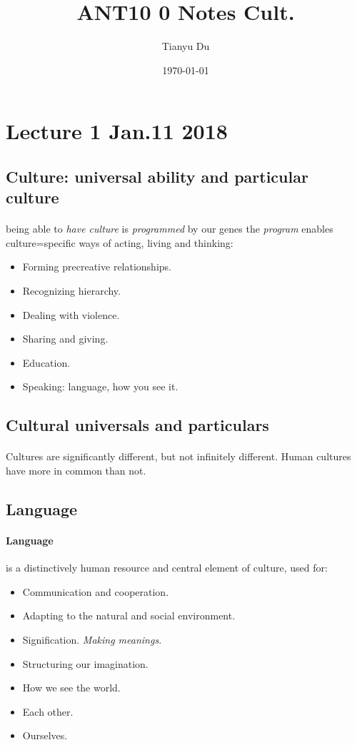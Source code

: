 \documentclass{article}
\title{ANT10 0 Notes Cult.}
\author{Tianyu Du}
\date{\today}
\begin{document}
	\maketitle
	\tableofcontents

	\section{Lecture 1 Jan.11 2018}
	\subsection{Culture: universal ability and particular culture}
	\paragraph{} being able to \emph{have culture} is \emph{programmed} by our genes the \emph{program} enables culture=specific ways of acting,
	living and thinking:
	\begin{itemize}
		\item Forming precreative relationships.
		\item Recognizing hierarchy.
		\item Dealing with violence.
		\item Sharing and giving.
		\item Education.
		\item Speaking: language, how you see it.
	\end{itemize}

	\subsection{Cultural universals and particulars}
	\paragraph{}Cultures are significantly different, but not infinitely different.
	\newline Human cultures have more in common than not.

	\subsection{Language}
	\paragraph{Language} is a distinctively human resource and central element of culture, used for:
	\begin{itemize}
		\item Communication and cooperation.
		\item Adapting to the natural and social environment.
		\item Signification. \emph{Making meanings}.
		\item Structuring our imagination.
		\item How we see the world.
		\item Each other.
		\item Ourselves.
	\end{itemize}
\end{document}
